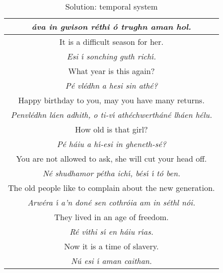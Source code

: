 \begin{table}[H]
{\begin{tabular}{|c|}
  \textit{\'{a}va in gwison r\'{e}thi \'{o} trughn aman hol.}\\
  \midrule
  It is a difficult season for her.\\
  \textit{Esi \'{\i} sonching guth rich\'{\i}.}\\
  \midrule
  What year is this again?\\
  \textit{P\'{e} vl\'{e}dhn a hesi sin ath\'{e}?}\\
  \midrule
  Happy birthday to you, may you have many returns.\\
  \textit{Penvl\'{e}dhn l\'{a}en adhith, o ti-v\'{\i} ath\'{e}chwerth\'{a}n\'{e} lh\'{a}en h\'{e}lu.}\\
  \midrule
  How old is that girl?\\
  \textit{P\'{e} h\'{a}iu a h\'{\i}-esi in gheneth-s\'{e}?}\\
  \midrule
  You are not allowed to ask, she will cut your head off.\\
  \textit{N\'{e} shudhamor p\'{e}tha ich\'{\i}, b\'{e}s\'{\i} \'{\i} t\'{o} ben.}\\
  \midrule
  The old people like to complain about the new generation.\\
  \textit{Arw\'{e}ra \'{\i} a’n don\'{e} sen cothr\'{o}ia am in s\'{e}thl n\'{o}i.}\\
  \midrule
  They lived in an age of freedom.\\
  \textit{R\'{e} v\'{\i}thi s\'{\i} en h\'{a}iu r\'{\i}as.}\\
  \midrule
  Now it is a time of slavery.\\
  \textit{N\'{u} esi \'{\i} aman caithan.}\\
  \bottomrule
  \end{tabular}
}
\label{solution_temporal_system}
\caption{Solution: temporal system}
\end{table}
